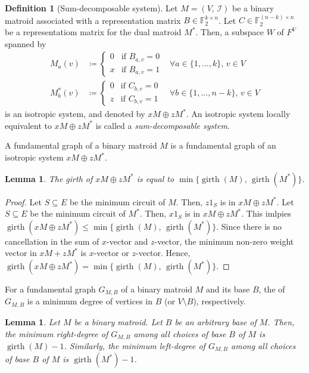 \documentclass[twoside,10pt]{article}
\DeclareMathOperator{\girth}{girth}
\newtheorem{lemma}[theorem]{Lemma}
\theoremstyle{definition}
\newtheorem{definition}[theorem]{Definition}
\theoremstyle{remark}
\begin{document}
\begin{definition}[Sum-decomposable system]
Let $M=(V,\,\mathcal{I})$ be a binary matroid associated with a representation matrix $B\in\mathbb{F}_2^{k\times n}$.
Let $C\in\mathbb{F}_2^{(n-k)\times n}$ be a representatiom matrix for the dual matroid $M^*$.
Then, a subspace $W$ of $F^V$ spanned by
\begin{align*}
M_a(v)&\coloneqq \begin{cases}
0&\text{if } B_{a, v} = 0\\
x&\text{if } B_{a, v} = 1
\end{cases}&\forall a\in\{1,\dotsc,k\},\,v\in V\\
M^*_b(v)&\coloneqq \begin{cases}
0&\text{if } C_{b, v} = 0\\
z&\text{if } C_{b, v} = 1
\end{cases}&\forall b\in\{1,\dotsc,n-k\},\,v\in V
\end{align*}
is an isotropic system, and denoted by $xM\oplus zM^*$.
An isotropic system locally equivalent to $xM\oplus zM^*$ is called a \textit{sum-decomposable system}.
\end{definition}

A fundamental graph of a binary matroid $M$ is a fundamental graph of an isotropic system $xM\oplus zM^*$.

\begin{lemma}
The girth of $xM\oplus zM^*$ is equal to $\min\{\girth(M),\,\girth(M^*)\}$.
\end{lemma}
\begin{proof}
Let $S\subseteq E$ be the minimum circuit of $M$.
Then, $z1_S$ is in $xM\oplus zM^*$.
Let $S\subseteq E$ be the minimum circuit of $M^*$.
Then, $x1_S$ is in $xM\oplus zM^*$.
This imlpies $\girth(xM\oplus zM^*)\le \min\{\girth(M),\,\girth(M^*)\}$.
Since there is no cancellation in the sum of $x$-vector and $z$-vector, the minimum non-zero weight vector in $xM+zM^*$ is $x$-vector or $z$-vector.
Hence, $\girth(xM\oplus zM^*)= \min\{\girth(M),\,\girth(M^*)\}$.
\end{proof}

For a fundamental graph $G_{M,B}$ of a binary matroid $M$ and its base $B$, the  of $G_{M,B}$ is a minimum degree of vertices in $B$ (or $V\setminus B$), respectively.

\begin{lemma}
Let $M$ be a binary matroid.
Let $B$ be an arbitrary base of $M$.
Then, the minimum right-degree of $G_{M,B}$ among all choices of base $B$ of $M$ is $\girth(M)-1$.
Similarly, the minimum left-degree of $G_{M,B}$ among all choices of base $B$ of $M$ is $\girth(M^*)-1$.
\end{lemma}
\end{document}
